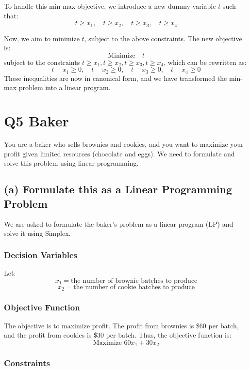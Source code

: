 \documentclass[11pt]{article}
\begin{document}
To handle this min-max objective, we introduce a new dummy variable \( t \) such that:
\[
t \geq x_1, \quad t \geq x_2, \quad t \geq x_3, \quad t \geq x_4
\]

Now, we aim to minimize \( t \), subject to the above constraints. The new objective is:
\[
\text{Minimize} \quad t
\]
subject to the constraints \( t \geq x_1, t \geq x_2, t \geq x_3, t \geq x_4 \), which can be rewritten as:
\[
t - x_1 \geq 0, \quad t - x_2 \geq 0, \quad t - x_3 \geq 0, \quad t - x_4 \geq 0
\]
These inequalities are now in canonical form, and we have transformed the min-max problem into a linear program.


\newpage


\section*{Q5 Baker}

You are a baker who sells brownies and cookies, and you want to maximize your profit given limited resources (chocolate and eggs). We need to formulate and solve this problem using linear programming.

\subsection*{(a) Formulate this as a Linear Programming Problem}

We are asked to formulate the baker's problem as a linear program (LP) and solve it using Simplex.

\subsubsection*{Decision Variables}

Let:
\[
x_1 = \text{the number of brownie batches to produce}
\]
\[
x_2 = \text{the number of cookie batches to produce}
\]

\subsubsection*{Objective Function}

The objective is to maximize profit. The profit from brownies is \$60 per batch, and the profit from cookies is \$30 per batch. Thus, the objective function is:
\[
\text{Maximize } 60x_1 + 30x_2
\]

\subsubsection*{Constraints}
\end{document}

